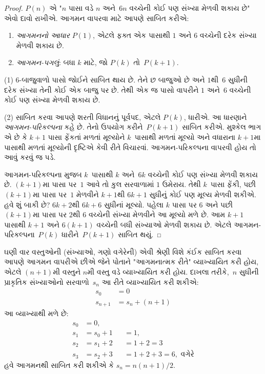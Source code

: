 \documentclass[../../../include/open-logic-section]{subfiles}
\begin{document}
\begin{proof}
$P(n)$ એ "$n$ પાસા વડે $n$ અને~$6n$ વચ્ચેની કોઈ પણ
સંખ્યા મેળવી શકાય છે" એવો દાવો રાખીએ. આગમન વાપરવા
માટે આપણે સાબિત કરીએ:
\begin{enumerate}
\item \emph{આગમનનો આધાર} $P(1)$, એટલે ફક્ત એક પાસાથી
  $1$ અને $6$ વચ્ચેની દરેક સંખ્યા મેળવી શકાય છે.
\item \emph{આગમન-પગલું}: બધા $k$ માટે, જો $P(k)$ તો~$P(k+1)$.
\end{enumerate}

(1) $6$-બાજુવાળો પાસો જોઈને સાબિત થાય છે. તેને છ બાજુઓ છે
અને $1$થી~$6$ સુધીની દરેક સંખ્યા તેની કોઈ એક બાજુ પર છે.
તેથી એક જ પાસો વાપરીને $1$ અને~$6$ વચ્ચેની કોઈ પણ સંખ્યા
મેળવી શકાય છે.

(2) સાબિત કરવા આપણે શરતી વિધાનનું પૂર્વપદ, એટલે $P(k)$,
ધારીએ. આ ધારણાને \emph{આગમન-પરિકલ્પના} કહે છે. તેનો
ઉપયોગ કરીને~$P(k+1)$ સાબિત કરીએ. મુશ્કેલ ભાગ એ છે કે
$k+1$ પાસા ફેંકતાં મળતાં મૂલ્યોને $k$~પાસાથી મળતાં
મૂલ્યો અને વધારાના $k+1$મા પાસાથી મળતાં મૂલ્યોની
દૃષ્ટિએ કેવી રીતે વિચારવાં. આગમન-પરિકલ્પના વાપરવી
હોય તો આવું કરવું જ પડે.

આગમન-પરિકલ્પના મુજબ $k$~પાસાથી $k$ અને~$6k$ વચ્ચેની
કોઈ પણ સંખ્યા મેળવી શકાય છે. $(k+1)$મા પાસા પર~$1$
આવે તો કુલ સરવાળામાં $1$ ઉમેરાય. તેથી $k$~પાસા ફેંકી,
પછી $(k+1)$મા પાસા પર~$1$ મેળવીને $k+1$થી $6k+1$
સુધીનું કોઈ પણ મૂલ્ય મેળવી શકીએ. હવે શું બાકી છે?
$6k+2$થી $6k+6$ સુધીનાં મૂલ્યો. પહેલા $k$ પાસા પર
$6$ અને પછી $(k+1)$મા પાસા પર $2$થી $6$ વચ્ચેની
સંખ્યા મેળવીને આ મૂલ્યો મળે છે. આમ $k+1$ પાસાથી
$k+1$ અને $6(k+1)$ વચ્ચેની બધી સંખ્યાઓ મેળવી શકાય છે.
એટલે આગમન-પરિકલ્પના~$P(k)$ ધારીને~$P(k+1)$ સાબિત થયું.
\end{proof}

ઘણી વાર વસ્તુઓની (સંખ્યાઓ, ગણો વગેરેની) એવી શ્રેણી
વિશે કંઈક સાબિત કરવા આપણે આગમન વાપરીએ છીએ જેને
પોતાને "આગમનાત્મક રીતે" વ્યાખ્યાયિત કરી હોય, એટલે
$(n+1)$મી વસ્તુને $n$મી વસ્તુ વડે વ્યાખ્યાયિત કરી હોય.
દાખલા તરીકે,~$n$ સુધીની પ્રાકૃતિક સંખ્યાઓનો સરવાળો~$s_n$
આ રીતે વ્યાખ્યાયિત કરી શકીએ:
\begin{align*}
  s_0 & = 0\\
  s_{n+1} & = s_n + (n+1)
\end{align*}
આ વ્યાખ્યાથી મળે છે:
\begin{align*}
  s_0 & = 0,\\
  s_1 & = s_0 + 1 && = 1,\\
  s_2 & = s_1 + 2 && = 1 + 2 = 3\\
  s_3 & = s_2 + 3 && = 1 + 2 + 3 = 6, \text{ વગેરે}
\end{align*}
હવે આગમનથી સાબિત કરી શકીએ કે $s_n = n(n+1)/2$.
\end{document}
